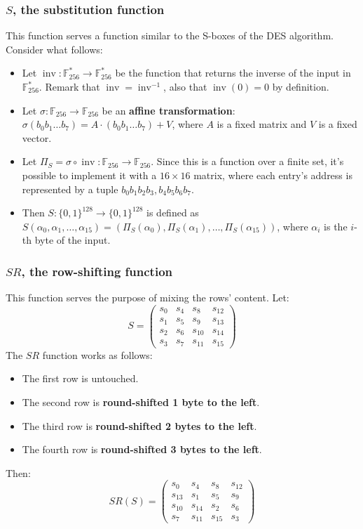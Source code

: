 \subsubsection{$S$, the substitution function}
This function serves a function similar to the S-boxes of the DES algorithm.\newline
Consider what follows:
\begin{itemize}
    \item Let $\operatorname{inv}: \mathbb{F}_{256}^{*} \rightarrow \mathbb{F}_{256}^{*}$ be the function that returns the inverse of the input in $\mathbb{F}_{256}^{*}$. Remark that $\operatorname{inv} = \operatorname{inv}^{-1}$, also that $\operatorname{inv}(0) = 0$ by definition.
    \item Let $\sigma: \mathbb{F}_{256} \rightarrow \mathbb{F}_{256}$ be an \textbf{affine transformation}: $\sigma(b_{0}b_{1}\dots b_{7}) = A \cdot (b_{0}b_{1}\dots b_{7}) + V$, where $A$ is a fixed matrix and $V$ is a fixed vector.
    \item Let $\Pi_{S} = \sigma \circ \operatorname{inv}: \mathbb{F}_{256} \rightarrow \mathbb{F}_{256}$. Since this is a function over a finite set, it's possible to implement it with a $16 \times 16$ matrix, where each entry's address is represented by a tuple $b_{0}b_{1}b_{2}b_{3}, b_{4}b_{5}b_{6}b_{7}$.
    \item Then $S: \{0, 1\}^{128} \rightarrow \{0, 1\}^{128}$ is defined as $S(\alpha_{0}, \alpha_{1}, \dots, \alpha_{15}) = (\Pi_{S}(\alpha_{0}), \Pi_{S}(\alpha_{1}), \dots, \Pi_{S}(\alpha_{15}))$, where $\alpha_{i}$ is the $i$-th byte of the input.
\end{itemize}
\subsubsection{$SR$, the row-shifting function}
This function serves the purpose of mixing the rows' content.\newline
Let: \[S = \begin{pmatrix}
s_{0} & s_{4} & s_{8} & s_{12} \\
s_{1} & s_{5} & s_{9} & s_{13} \\
s_{2} & s_{6} & s_{10} & s_{14} \\
s_{3} & s_{7} & s_{11} & s_{15}
\end{pmatrix}\]
The $SR$ function works as follows:
\begin{itemize}
    \item The first row is untouched.
    \item The second row is \textbf{round-shifted 1 byte to the left}.
    \item The third row is \textbf{round-shifted 2 bytes to the left}.
    \item The fourth row is \textbf{round-shifted 3 bytes to the left}.
\end{itemize}
Then: \[SR(S) = \begin{pmatrix}
s_{0} & s_{4} & s_{8} & s_{12} \\
s_{13} & s_{1} & s_{5} & s_{9} \\
s_{10} & s_{14} & s_{2} & s_{6} \\
s_{7} & s_{11} & s_{15} & s_{3}
\end{pmatrix}\]

